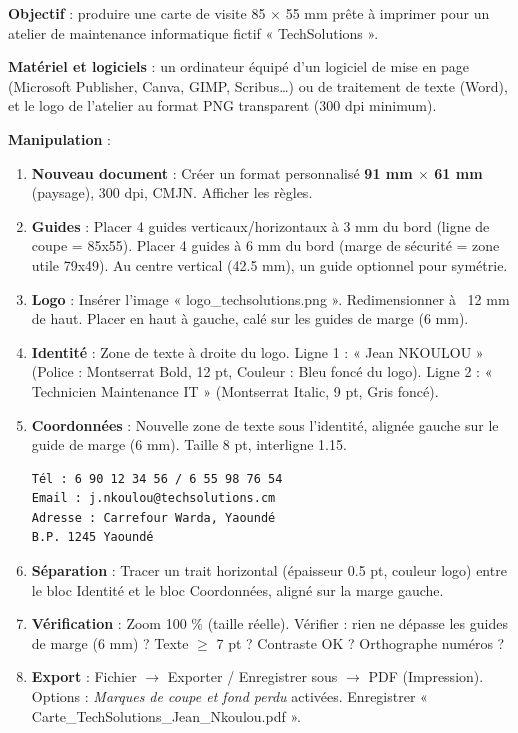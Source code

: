 \documentclass[11pt]{article}
\begin{document}
\begin{experience}
\textbf{Objectif} : produire une carte de visite 85 $\times$ 55 mm prête à imprimer pour un atelier de maintenance informatique fictif « TechSolutions ».

\textbf{Matériel et logiciels} : un ordinateur équipé d'un logiciel de mise en page (Microsoft Publisher, Canva, GIMP, Scribus\ldots) ou de traitement de texte (Word), et le logo de l'atelier au format PNG transparent (300 dpi minimum).

\textbf{Manipulation} :
\begin{enumerate}
\item \textbf{Nouveau document} : Créer un format personnalisé \textbf{91 mm $\times$ 61 mm} (paysage), 300 dpi, CMJN. Afficher les règles.
\item \textbf{Guides} : Placer 4 guides verticaux/horizontaux à 3 mm du bord (ligne de coupe = 85x55). Placer 4 guides à 6 mm du bord (marge de sécurité = zone utile 79x49). Au centre vertical (42.5 mm), un guide optionnel pour symétrie.
\item \textbf{Logo} : Insérer l'image « logo\_techsolutions.png ». Redimensionner à ~12 mm de haut. Placer en haut à gauche, calé sur les guides de marge (6 mm).
\item \textbf{Identité} : Zone de texte à droite du logo. Ligne 1 : « Jean NKOULOU » (Police : Montserrat Bold, 12 pt, Couleur : Bleu foncé du logo). Ligne 2 : « Technicien Maintenance IT » (Montserrat Italic, 9 pt, Gris foncé).
\item \textbf{Coordonnées} : Nouvelle zone de texte sous l'identité, alignée gauche sur le guide de marge (6 mm). Taille 8 pt, interligne 1.15.
\begin{lstlisting}
Tél : 6 90 12 34 56 / 6 55 98 76 54
Email : j.nkoulou@techsolutions.cm
Adresse : Carrefour Warda, Yaoundé
B.P. 1245 Yaoundé
\end{lstlisting}
\item \textbf{Séparation} : Tracer un trait horizontal (épaisseur 0.5 pt, couleur logo) entre le bloc Identité et le bloc Coordonnées, aligné sur la marge gauche.
\item \textbf{Vérification} : Zoom 100 \% (taille réelle). Vérifier : rien ne dépasse les guides de marge (6 mm) ? Texte $\ge$ 7 pt ? Contraste OK ? Orthographe numéros ?
\item \textbf{Export} : Fichier $\rightarrow$ Exporter / Enregistrer sous $\rightarrow$ PDF (Impression). Options : \emph{Marques de coupe et fond perdu} activées. Enregistrer « Carte\_TechSolutions\_Jean\_Nkoulou.pdf ».
\end{enumerate}


\end{experience}
\end{document}
